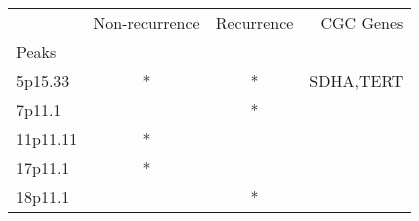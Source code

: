 \begin{tabular}{lccr}
\toprule
{} & Non-recurrence & Recurrence &  CGC Genes \\
Peaks    &                &            &            \\
\midrule
5p15.33  &              * &          * &  SDHA,TERT \\
7p11.1   &                &          * &            \\
11p11.11 &              * &            &            \\
17p11.1  &              * &            &            \\
18p11.1  &                &          * &            \\
\bottomrule
\end{tabular}
